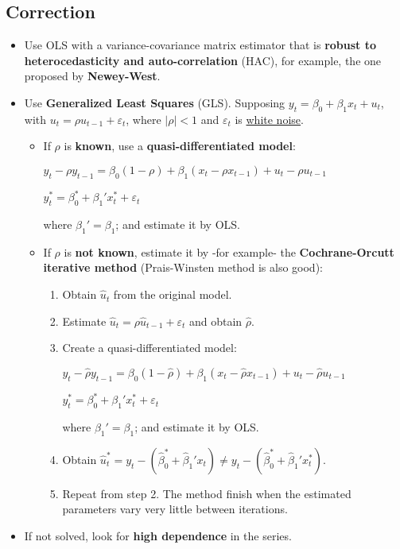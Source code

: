\documentclass[10pt, a4paper, landscape]{extarticle}
\begin{document}
\begin{multicols}{3}
\begin{itemize}[leftmargin=*]
\end{itemize}

\subsection*{Correction}

\begin{itemize}[leftmargin=*]
	\item Use OLS with a variance-covariance matrix estimator that is \textbf{robust to heterocedasticity and auto-correlation} (HAC), for example, the one proposed by \textbf{Newey-West}.
	\item Use \textbf{Generalized Least Squares} (GLS). Supposing $y_t = \beta_0 + \beta_1 x_t + u_t$, with $u_t = \rho u_{t - 1} + \varepsilon_t$, where $\lvert \rho \rvert < 1$ and $\varepsilon_t$ is \underline{white noise}.
	\begin{itemize}[leftmargin=*]
		\item If $\rho$ is \textbf{known}, use a \textbf{quasi-differentiated model}:
		\begin{center}
			$y_t - \rho y_{t - 1} = \beta_0 (1 - \rho) + \beta_1 (x_t - \rho x_{t - 1}) + u_t - \rho u_{t - 1}$
			
			$y_t^* = \beta_0^* + \beta_1' x_t^* + \varepsilon_t$
		\end{center}
		where $\beta_1' = \beta_1$; and estimate it by OLS.
		\item If $\rho$ is \textbf{not known}, estimate it by -for example- the \textbf{Cochrane-Orcutt iterative method} (Prais-Winsten method is also good):
		\begin{enumerate}[leftmargin=*]
			\item Obtain $\hat{u}_t$ from the original model.
			\item Estimate $\hat{u}_t = \rho \hat{u}_{t-1} + \varepsilon_t$ and obtain $\hat{\rho}$.
			\item Create a quasi-differentiated model:
			\begin{center}
				$y_t - \hat{\rho} y_{t - 1} = \beta_0 (1 - \hat{\rho}) + \beta_1 (x_t - \hat{\rho} x_{t - 1}) + u_t - \hat{\rho} u_{t - 1}$
				
				$y_t^* = \beta_0^* + \beta_1' x_t^* + \varepsilon_t$
			\end{center}
			where $\beta_1' = \beta_1$; and estimate it by OLS.
			\item Obtain $\hat{u}_t^* = y_t - (\hat{\beta}_0^* + \hat{\beta}_1' x_t) \neq y_t - (\hat{\beta}_0^* + \hat{\beta}_1' x_t^*)$.
			\item Repeat from step 2. The method finish when the estimated parameters vary very little between iterations.
		\end{enumerate}
	\end{itemize}
	\item If not solved, look for \textbf{high dependence} in the series.
\end{itemize}


\end{multicols}
\end{document}
